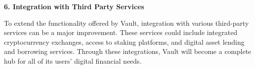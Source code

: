 \textbf{6. Integration with Third Party Services}

To extend the functionality offered by Vault, integration with various third-party services can be a major improvement. These services could include integrated cryptocurrency exchanges, access to staking platforms, and digital asset lending and borrowing services. Through these integrations, Vault will become a complete hub for all of its users' digital financial needs.